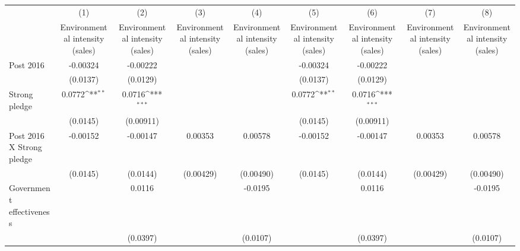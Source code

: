 {
\def\sym#1{\ifmmode^{#1}\else\(^{#1}\)\fi}
\begin{tabular}{l*{8}{c}}
\hline\hline
                    &\multicolumn{1}{c}{(1)}&\multicolumn{1}{c}{(2)}&\multicolumn{1}{c}{(3)}&\multicolumn{1}{c}{(4)}&\multicolumn{1}{c}{(5)}&\multicolumn{1}{c}{(6)}&\multicolumn{1}{c}{(7)}&\multicolumn{1}{c}{(8)}\\
                    &\multicolumn{1}{c}{Environmental intensity (sales)}&\multicolumn{1}{c}{Environmental intensity (sales)}&\multicolumn{1}{c}{Environmental intensity (sales)}&\multicolumn{1}{c}{Environmental intensity (sales)}&\multicolumn{1}{c}{Environmental intensity (sales)}&\multicolumn{1}{c}{Environmental intensity (sales)}&\multicolumn{1}{c}{Environmental intensity (sales)}&\multicolumn{1}{c}{Environmental intensity (sales)}\\
\hline
Post 2016           &    -0.00324         &    -0.00222         &                     &                     &    -0.00324         &    -0.00222         &                     &                     \\
                    &    (0.0137)         &    (0.0129)         &                     &                     &    (0.0137)         &    (0.0129)         &                     &                     \\
[1em]
Strong pledge       &      0.0772\sym{**} &      0.0716\sym{***}&                     &                     &      0.0772\sym{**} &      0.0716\sym{***}&                     &                     \\
                    &    (0.0145)         &   (0.00911)         &                     &                     &    (0.0145)         &   (0.00911)         &                     &                     \\
[1em]
Post 2016 X Strong pledge&    -0.00152         &    -0.00147         &     0.00353         &     0.00578         &    -0.00152         &    -0.00147         &     0.00353         &     0.00578         \\
                    &    (0.0145)         &    (0.0144)         &   (0.00429)         &   (0.00490)         &    (0.0145)         &    (0.0144)         &   (0.00429)         &   (0.00490)         \\
[1em]
Government effectiveness&                     &      0.0116         &                     &     -0.0195         &                     &      0.0116         &                     &     -0.0195         \\
                    &                     &    (0.0397)         &                     &    (0.0107)         &                     &    (0.0397)         &                     &    (0.0107)         \\

\end{tabular}}
